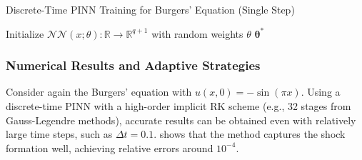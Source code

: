 \begin{algorithm}[htbp] %
\caption{Discrete-Time PINN Training for Burgers' Equation (Single Step)}
\label{alg:dt_pinn_burgers}
\SetAlgoLined
{}

Initialize $\mathcal{NN}(x;\theta): \mathbb{R} \rightarrow \mathbb{R}^{q+1}$ with random weights $\theta$\;
\Return $\boldsymbol{\theta}^*$
\end{algorithm}

\subsubsection{Numerical Results and Adaptive Strategies}

Consider again the Burgers' equation with $u(x,0) = -\sin(\pi x)$. Using a discrete-time PINN with a high-order implicit RK scheme (e.g., 32 stages from Gauss-Legendre methods), accurate results can be obtained even with relatively large time steps, such as $\Delta t = 0.1$.  shows that the method captures the shock formation well, achieving relative errors around $10^{-4}$.

